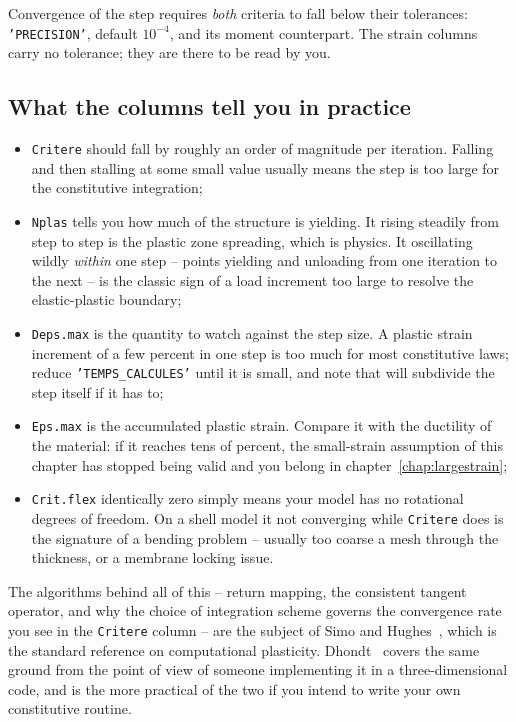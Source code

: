 Convergence of the step requires \emph{both} criteria to fall below their
tolerances: \texttt{'PRECISION'}, default $10^{-4}$, and its moment
counterpart. The strain columns carry no tolerance; they are there to be
read by you.

\subsection*{What the columns tell you in practice}

\begin{itemize}
\item \texttt{Critere} should fall by roughly an order of magnitude per
  iteration. Falling and then stalling at some small value usually means the
  step is too large for the constitutive integration;
\item \texttt{Nplas} tells you how much of the structure is yielding. It
  rising steadily from step to step is the plastic zone spreading, which is
  physics. It oscillating wildly \emph{within} one step -- points yielding
  and unloading from one iteration to the next -- is the classic sign of a
  load increment too large to resolve the elastic-plastic boundary;
\item \texttt{Deps.max} is the quantity to watch against the step size. A
  plastic strain increment of a few percent in one step is too much for
  most constitutive laws; reduce \texttt{'TEMPS\_CALCULES'} until it is
  small, and note that  will subdivide the step itself if it has
  to;
\item \texttt{Eps.max} is the accumulated plastic strain. Compare it with the
  ductility of the material: if it reaches tens of percent, the small-strain
  assumption of this chapter has stopped being valid and you belong in
  chapter~\ref{chap:largestrain};
\item \texttt{Crit.flex} identically zero simply means your model has no
  rotational degrees of freedom. On a shell model it not converging while
  \texttt{Critere} does is the signature of a bending problem -- usually too
  coarse a mesh through the thickness, or a membrane locking issue.
\end{itemize}

\noindent The algorithms behind all of this -- return mapping, the consistent
tangent operator, and why the choice of integration scheme governs the
convergence rate you see in the \texttt{Critere} column -- are the subject of
Simo and Hughes~\cite{Simo:1998}, which is the standard reference on
computational plasticity. Dhondt~\cite{Dhondt:2004} covers the same ground
from the point of view of someone implementing it in a three-dimensional
code, and is the more practical of the two if you intend to write your own
constitutive routine.

